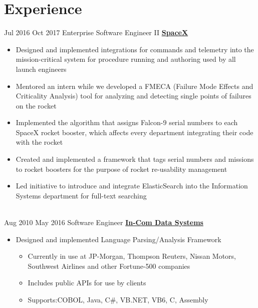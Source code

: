 \documentclass[letterpaper]{resume}
\begin{document}
	
\makeprofile %

\section{Experience}
\begin{twenty}
	\twentyitem
	{Jul 2016}
	{Oct 2017}
	{Enterprise Software Engineer II}
	{\href{http://www.spacex.com/}{\textbf{SpaceX}}}
	{}
	{\begin{itemize}
		\item Designed and implemented integrations for commands and telemetry into the mission-critical system for procedure running and authoring used by all launch engineers
		
		\item Mentored an intern while we developed a FMECA (Failure Mode Effects and Criticality Analysis) tool for analyzing and detecting single points of failures on the rocket
		
		\item Implemented the algorithm that assigns Falcon-9 serial numbers to each SpaceX rocket booster, which affects every department integrating their code with the rocket
		
		\item Created and implemented a framework that tags serial numbers and missions to rocket boosters for the purpose of rocket re-usability management
		
		\item Led initiative to introduce and integrate ElasticSearch into the Information Systems department for full-text searching
	\end{itemize}}
	
	\\
	
	\twentyitem
	{Aug 2010}
	{May 2016}
	{Software Engineer}
	{\href{http://in-com.com/}{\textbf{In-Com Data Systems}}}
	{}
	{
		\begin{itemize}
			\item Designed and implemented Language Parsing/Analysis Framework {}
			
			\begin{itemize}
			\item Currently in use at JP-Morgan, Thompson Reuters, Nissan Motors, Southwest Airlines and other Fortune-500 companies
			
			\item Includes public APIs for use by clients
			
			\item Supports:COBOL, Java, C\#, VB.NET, VB6, C, Assembly
			
		\end{itemize}
		\end{itemize}
	}
\end{twenty}
\end{document}
